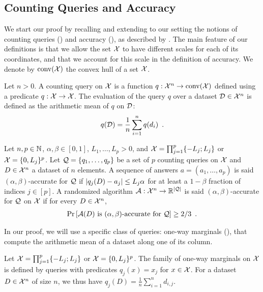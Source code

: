 \subsection{Counting Queries and Accuracy}
\label{sec:accur-re-ident}

We start our proof by recalling and extending to our setting the notions of
counting queries () and accuracy (),
as described by \citet{bun2014Fingerprinting}.
The main feature of our definitions is that we allow the set $\mathcal X$ to have
different scales for each of its coordinates, and that we account for this scale
in the definition of accuracy.
We denote by $\operatorname{conv}(\mathcal X)$ the convex hull of a set $\mathcal X$.

\begin{definition}
  \label{def:counting-query}
  Let $n > 0$.
  A counting query on $\mathcal X$ is a function $q : \mathcal X^n \rightarrow \operatorname{conv}(\mathcal X)$ defined
  using a predicate   $q : \mathcal X \rightarrow \mathcal X$.
  The evaluation of the query $q$ over a dataset $\mathcal D \in \mathcal X^n$ is defined as
  the arithmetic mean of $q$ on $\mathcal D$:
  \begin{align}
    q(\mathcal D) = \frac{1}{n} \sum_{i=1}^n q(d_i)\enspace.
  \end{align}
\end{definition}

\begin{definition}[Accuracy]
  \label{def:accuracy}
  Let $n, p \in \mathbb N$, $\alpha, \beta \in [0, 1]$, $L_1, \dots, L_p > 0$,
  and $\mathcal X = \prod_{j=1}^p \{-L_j; L_j\}$ or $\mathcal X = \{0, L_j\}^p$.
  Let $\mathcal Q = \{q_1, \dots, q_p\}$ be a set of $p$ counting queries on $\mathcal X$ and
  $D \in \mathcal X^n$ a dataset of $n$ elements.
  A sequence of answers $a = (a_1, \dots, a_p)$ is said $(\alpha, \beta)$-accurate
  for $\mathcal Q$ if $\left| q_j(D) - a_j \right| \le L_j\alpha$ for at least a
  $1 - \beta$ fraction of indices $j \in [p]$.
  A randomized algorithm $\mathcal A : \mathcal X^n \rightarrow \mathbb R^{\left| \mathcal Q \right|}$ is said
  $(\alpha, \beta)$-accurate for $\mathcal Q$ on $\mathcal X$ if for every $D \in \mathcal X^n$,
  \begin{align}
    \textnormal{Pr} \left[ \mathcal A(D) \text{ is } (\alpha, \beta)\text{-accurate for } \mathcal Q \right] \ge 2/3\enspace.
  \end{align}
\end{definition}

In our proof, we will use a specific class of queries: one-way marginals
(), that compute the arithmetic mean of a dataset
along one of its column.
\begin{definition}
  \label{def:one-way-marginals}
  Let $\mathcal X = \prod_{j=1}^p \{-L_j; L_j\}$ or $\mathcal X = \{0, L_j\}^p$.
  The family of one-way marginals on $\mathcal X$ is defined by queries with predicates
  $q_j(x) = x_j$ for $x \in \mathcal X$.
  For a dataset $D \in \mathcal X^n$ of size $n$, we thus have
  $q_j(D) = \frac{1}{n} \sum_{i=1}^n d_{i,j}$.
\end{definition}



